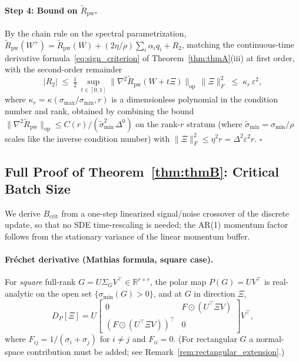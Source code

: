 \documentclass{article}
\begin{document}
\paragraph{Step 4: Bound on $\widetilde R_{\mathrm{pw}}$.}
By the chain rule on the spectral parametrization, $\widetilde R_{\mathrm{pw}}(W^+) = \widetilde R_{\mathrm{pw}}(W) + (2\eta/\rho)\sum_i\alpha_i q_i + R_2$, matching the continuous-time derivative formula~\eqref{eq:sign_criterion} of Theorem~\ref{thm:thmA}(iii) at first order, with the second-order remainder
\[
|R_2| \;\leq\; \tfrac12\,\sup_{t\in[0,1]}\|\nabla^2\widetilde R_{\mathrm{pw}}(W+t\Xi)\|_{\mathrm{op}}\,\|\Xi\|_F^2 \;\leq\; \kappa_r\,\varepsilon^2,
\]
where $\kappa_r=\kappa(\sigma_{\max}/\sigma_{\min},r)$ is a dimensionless polynomial in the condition number and rank, obtained by combining the bound $\|\nabla^2\widetilde R_{\mathrm{pw}}\|_{\mathrm{op}}\leq C(r)/(\widetilde\sigma_{\min}^2\,\Delta^0)$ on the rank-$r$ stratum (where $\widetilde\sigma_{\min}=\sigma_{\min}/\rho$ scales like the inverse condition number) with $\|\Xi\|_F^2\leq\eta^2 r=\Delta^2\varepsilon^2 r$. \hfill$\square$

\subsection{Full Proof of Theorem~\ref{thm:thmB}: Critical Batch Size}
\label{app:proof_thmB}

We derive $B_{\mathrm{crit}}$ from a one-step linearized signal/noise crossover of the discrete update, so that no SDE time-rescaling is needed; the AR(1) momentum factor follows from the stationary variance of the linear momentum buffer.

\paragraph{Fr\'echet derivative (Mathias formula, square case).}
For \emph{square} full-rank $G = U\Sigma_G V^\top \in\mathbb R^{r\times r}$, the polar map $P(G)=UV^\top$ is real-analytic on the open set $\{\sigma_{\min}(G)>0\}$, and at $G$ in direction $\Xi$,
\[
  D_P[\Xi] = U \begin{bmatrix} 0 & F\odot(U^\top\Xi V) \\ (F\odot(U^\top\Xi V))^\top & 0 \end{bmatrix} V^\top,
\]
where $F_{ij} = 1/(\sigma_i+\sigma_j)$ for $i\neq j$ and $F_{ii}=0$. (For rectangular $G$ a normal-space contribution must be added; see Remark~\ref{rem:rectangular_extension}.)
\end{document}
